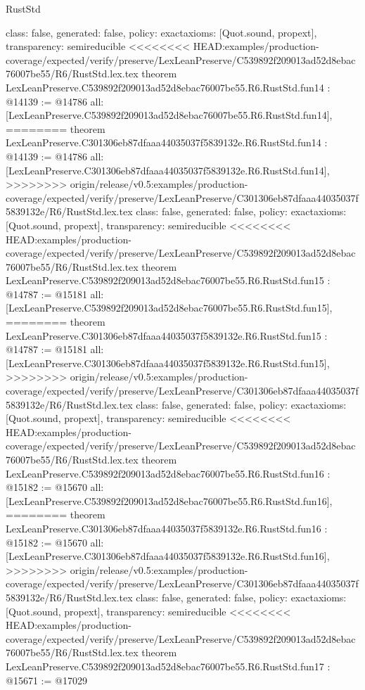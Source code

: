 \begin{lexlean}{RustStd}
\begin{coremodule}
{\begin{coremodule}
{{{{{{{{{{{{{{{{{  class: false,
  generated: false,
  policy: exact{axioms: [Quot.sound, propext]},
  transparency: semireducible
}
<<<<<<<< HEAD:examples/production-coverage/expected/verify/preserve/LexLeanPreserve/C539892f209013ad52d8ebac76007be55/R6/RustStd.lex.tex
theorem LexLeanPreserve.C539892f209013ad52d8ebac76007be55.R6.RustStd.fun14 : @14139 := @14786 {
  all: [LexLeanPreserve.C539892f209013ad52d8ebac76007be55.R6.RustStd.fun14],
========
theorem LexLeanPreserve.C301306eb87dfaaa44035037f5839132e.R6.RustStd.fun14 : @14139 := @14786 {
  all: [LexLeanPreserve.C301306eb87dfaaa44035037f5839132e.R6.RustStd.fun14],
>>>>>>>> origin/release/v0.5:examples/production-coverage/expected/verify/preserve/LexLeanPreserve/C301306eb87dfaaa44035037f5839132e/R6/RustStd.lex.tex
  class: false,
  generated: false,
  policy: exact{axioms: [Quot.sound, propext]},
  transparency: semireducible
}
<<<<<<<< HEAD:examples/production-coverage/expected/verify/preserve/LexLeanPreserve/C539892f209013ad52d8ebac76007be55/R6/RustStd.lex.tex
theorem LexLeanPreserve.C539892f209013ad52d8ebac76007be55.R6.RustStd.fun15 : @14787 := @15181 {
  all: [LexLeanPreserve.C539892f209013ad52d8ebac76007be55.R6.RustStd.fun15],
========
theorem LexLeanPreserve.C301306eb87dfaaa44035037f5839132e.R6.RustStd.fun15 : @14787 := @15181 {
  all: [LexLeanPreserve.C301306eb87dfaaa44035037f5839132e.R6.RustStd.fun15],
>>>>>>>> origin/release/v0.5:examples/production-coverage/expected/verify/preserve/LexLeanPreserve/C301306eb87dfaaa44035037f5839132e/R6/RustStd.lex.tex
  class: false,
  generated: false,
  policy: exact{axioms: [Quot.sound, propext]},
  transparency: semireducible
}
<<<<<<<< HEAD:examples/production-coverage/expected/verify/preserve/LexLeanPreserve/C539892f209013ad52d8ebac76007be55/R6/RustStd.lex.tex
theorem LexLeanPreserve.C539892f209013ad52d8ebac76007be55.R6.RustStd.fun16 : @15182 := @15670 {
  all: [LexLeanPreserve.C539892f209013ad52d8ebac76007be55.R6.RustStd.fun16],
========
theorem LexLeanPreserve.C301306eb87dfaaa44035037f5839132e.R6.RustStd.fun16 : @15182 := @15670 {
  all: [LexLeanPreserve.C301306eb87dfaaa44035037f5839132e.R6.RustStd.fun16],
>>>>>>>> origin/release/v0.5:examples/production-coverage/expected/verify/preserve/LexLeanPreserve/C301306eb87dfaaa44035037f5839132e/R6/RustStd.lex.tex
  class: false,
  generated: false,
  policy: exact{axioms: [Quot.sound, propext]},
  transparency: semireducible
}
<<<<<<<< HEAD:examples/production-coverage/expected/verify/preserve/LexLeanPreserve/C539892f209013ad52d8ebac76007be55/R6/RustStd.lex.tex
theorem LexLeanPreserve.C539892f209013ad52d8ebac76007be55.R6.RustStd.fun17 : @15671 := @17029 {
}}}}}}}}}}}}}}}}}}}}
\end{coremodule}}
\end{coremodule}
\end{lexlean}
